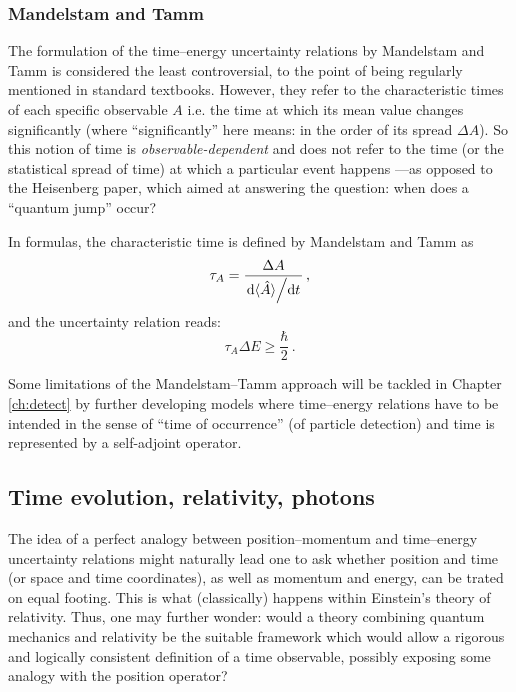 \subsubsection{Mandelstam and Tamm}

The formulation of the time--energy uncertainty relations by Mandelstam and Tamm
\parencite{MandelstamTamm} is considered the least controversial, to the point
of being regularly mentioned in standard textbooks. However,
they refer to the characteristic times of each specific observable $A$ i.e.
the time at which its mean value changes significantly (where ``significantly''
here means: in the order of its spread $\Delta{A}$). So this notion of time
is \emph{observable-dependent} and does not refer to the time (or the statistical spread of time)
at which a particular event happens
---as opposed to the Heisenberg paper, which aimed at answering the question: when does
a ``quantum jump'' occur?

In formulas, the characteristic time is defined by Mandelstam and Tamm as
\begin{equation}
  \tau_{A} = \frac{ \Delta{A} } { \dv*{\langle\hat{A}\rangle}{t} } \, \text{,}
\end{equation}
and the uncertainty relation reads:
\begin{equation}
  \tau_{A}\Delta{E} \ge \frac{\hbar}{2} \, \text{.}
\end{equation}

Some limitations of the Mandelstam--Tamm
approach
will be tackled
in
Chapter \ref{ch:detect}
by further developing
models where time--energy relations have to be intended in the sense
of ``time of occurrence'' (of particle detection)
and time is represented
by a self-adjoint operator.

% 

\subsection{Time evolution, relativity, photons}\label{sec:trel}

The idea of a perfect analogy between
position--momentum and time--energy uncertainty relations 
might naturally lead one to ask whether position and time
(or space and time coordinates), as well as momentum and energy, can be trated on
equal footing. This is what (classically) happens within Einstein's theory of relativity.
Thus, one may further wonder:
would a theory combining quantum mechanics and
relativity be the suitable framework which would allow a rigorous and logically consistent
definition of a time observable,
possibly exposing some analogy with the position operator?

